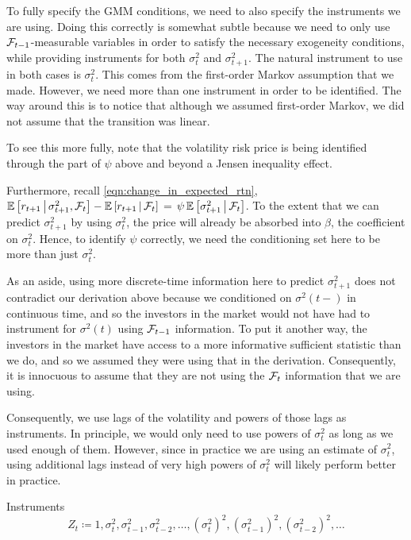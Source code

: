 \documentclass[11pt, letterpaper, twoside, final]{article}
\begin{document}
To fully specify the GMM conditions, we need to also specify the instruments we are using.
Doing this correctly is somewhat subtle because we need to only use $\mathcal{F}_{t-1}$-measurable variables in order to
satisfy the necessary exogeneity conditions, while providing instruments for both $\sigma^2_t$ and
$\sigma^2_{t+1}$. 
The natural instrument to use in both cases is $\sigma^2_t$.
This comes from the first-order Markov assumption that we made.
However, we need more than one instrument in order to be identified.
The way around this is to notice that although we assumed first-order Markov, we did not assume that the
transition was linear. 

To see this more fully, note that the volatility risk price is being identified through the part of $\psi$ above
and beyond a Jensen inequality effect.

Furthermore, recall \cref{eqn:change_in_expected_rtn},  $\operatorname{\mathbb{E}}\left[r_{t+1} \,\middle\vert\, \sigma^2_{t+1}, \mathcal{F}_{t}\right]  -
\operatorname{\mathbb{E}}\left[ r_{t+1} \,\middle\vert\, \mathcal{F}_t\right]$ = $\psi \operatorname{\mathbb{E}}\left[\sigma^2_{t+1} \,\middle\vert\, \mathcal{F}_t\right]$.
To the extent that we can predict $\sigma^2_{t+1}$ by using $\sigma^2_t$, the price will already be absorbed into
$\beta$, the coefficient on $\sigma^2_t$.
Hence, to identify $\psi$ correctly, we need the conditioning set here to be more than just $\sigma^2_t$.


As an aside, using more discrete-time information here to predict $\sigma^2_{t+1}$ does not contradict our
derivation above because we conditioned on $\sigma^2(t-)$ in continuous time, and so the investors in the market
would not have had to instrument for $\sigma^2(t)$ using $\mathcal{F}_{t-1}$ information.
To put it another way, the investors in the market have access to a more informative sufficient statistic than we
do, and so we assumed they were using that in the derivation.
Consequently, it is innocuous to assume that they are not using the $\mathcal{F}_{t}$ information that we are using.

Consequently, we use lags of the volatility and powers of those lags as instruments.
In principle, we would only need to use powers of $\sigma^2_t$ as long as we used enough of them.
However, since in practice we are using an estimate of $\sigma^2_t$, using additional lags instead of very high
powers of $\sigma^2_t$ will likely perform better in practice.


\begin{defn}{Instruments}
    \label{defn:instruments}
    \begin{equation}
        Z_t \coloneqq 1, \sigma^2_{t}, \sigma^2_{t-1}, \sigma^2_{t-2}, \ldots, (\sigma^2_{t})^2,
        (\sigma^2_{t-1})^2, (\sigma^2_{t-2})^2, \ldots
    \end{equation}
\end{defn}
\end{document}
